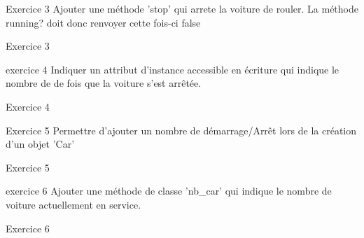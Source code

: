 \documentclass{beamer}
\begin{document}
\begin{frame}
  \begin{block}{Exercice 3}
  Ajouter une m\'ethode 'stop' qui arrete la voiture de rouler. La m\'ethode running?
  doit donc renvoyer cette fois-ci false
\end{block}
\end{frame}
\begin{frame}
  \begin{beamerboxesrounded}{Exercice 3}
    
  \end{beamerboxesrounded}
\end{frame}

\begin{frame}
  \begin{block}{exercice 4}
  Indiquer un attribut d'instance accessible en \'ecriture qui indique le nombre de
  de fois que la voiture s'est arrêt\'ee.
\end{block}
\end{frame}
\begin{frame}
  \begin{beamerboxesrounded}{Exercice 4}
    
  \end{beamerboxesrounded}
\end{frame}

\begin{frame}
  \begin{block}{Exercice 5}
  Permettre d'ajouter un nombre de d\'emarrage/Arrêt lors de la cr\'eation
  d'un objet 'Car'
\end{block}
\end{frame}
\begin{frame}
  \begin{beamerboxesrounded}{Exercice 5}
    
  \end{beamerboxesrounded}
\end{frame}

\begin{frame}
  \begin{block}{exercice 6}
  Ajouter une m\'ethode de classe 'nb\_car' qui indique le nombre de voiture actuellement en
  service.
\end{block}
\end{frame}
\begin{frame}
  \begin{beamerboxesrounded}{Exercice 6}
    
  \end{beamerboxesrounded}
\end{frame}
\end{document}
